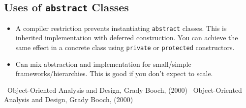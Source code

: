 \documentclass[12pt,notitlepage]{article}
\begin{document}
\begin{s5presentation}
\begin{ifhtml}
\begin{s5slide}
      \subsection{Uses of \texttt{abstract} Classes}
      \begin{itemize}
        \item A compiler restriction prevents instantiating \texttt{abstract} classes. This
          is inherited implementation with deferred construction. You can achieve the same 
          effect in a concrete class using \texttt{private} or \texttt{protected} constructors.
        \item Can mix abstraction and implementation for small/simple frameworks/hierarchies.
          This is good if you don't expect to scale.         
      \end{itemize}
    \end{s5slide}
  \end{ifhtml}

  \W \end{s5presentation}
  \begin{tex}
    \begin{thebibliography}{20}
     ~Object-Oriented Analysis and Design, Grady Booch, (2000) 
     ~Object-Oriented Analysis and Design, Grady Booch, (2000) 
    \end{thebibliography}
  \end{tex}
\end{document}
